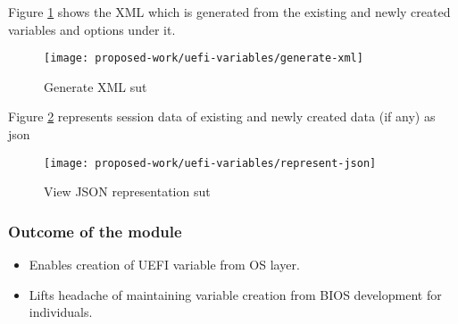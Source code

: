 Figure \ref{fig:uefi-variable-generate-xml} shows the XML which is generated from the existing and newly created variables and options under it.
\begin{figure}[!htbp]
  \centering
  \texttt{[image: proposed-work/uefi-variables/generate-xml]}
  \caption{Generate XML \gls{sut}}\label{fig:uefi-variable-generate-xml}
\end{figure}

Figure \ref{fig:uefi-variable-represent-json} represents session data of existing and newly created data (if any) as json
\begin{figure}[!htbp]
  \centering
  \texttt{[image: proposed-work/uefi-variables/represent-json]}
  \caption{View JSON representation \gls{sut}}\label{fig:uefi-variable-represent-json}
\end{figure}


\subsubsection{Outcome of the module}
\begin{itemize}
	\item Enables creation of UEFI variable from OS layer.
	\item Lifts headache of maintaining variable creation from BIOS development for individuals.
\end{itemize}

